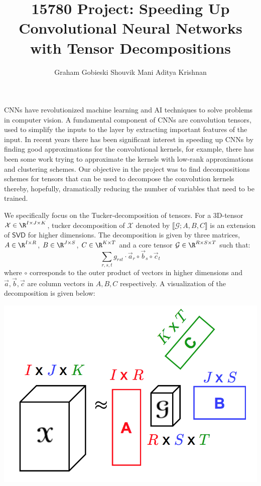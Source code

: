 \documentclass[a4paper]{article}
\title{\vspace{-2em} 15780 Project: Speeding Up Convolutional Neural Networks with Tensor Decompositions}
\author{Graham Gobieski \quad  Shouvik Mani \quad  Aditya Krishnan}
\date{ \vspace{-2em}}
\begin{document}
\maketitle

CNNs have revolutionized machine learning and AI techniques to solve problems in computer vision. A fundamental component of CNNs are convolution tensors, used to simplify the inputs to the layer by extracting important features of the input. In recent years there has been significant interest in speeding up CNNs by finding good approximations for the convolutional kernels, for example, there has been some work trying to approximate the kernels with low-rank approximations and clustering schemes. Our objective in the project was to find decompositions schemes for tensors that can be used to decompose the convolution kernels thereby, hopefully, dramatically reducing the number of variables that need to be trained. 

We specifically focus on the Tucker-decomposition of tensors. For a 3D-tensor $\mathcal{X} \in \R^{I \times J \times K}$, tucker decomposition of $\mathcal{X}$ denoted by $\llbracket \mathcal{G}; A, B, C \rrbracket$ is an extension of $\mathsf{SVD}$ for higher dimensions. The decomposition is given by three matrices, $A \in \R^{I \times R}$, $B \in \R^{J \times S}$, $C \in \R^{K \times T}$ and a core tensor $\mathcal{G} \in \R^{R \times S \times T}$ such that: 
$$ \sum_{r, s , t} g_{rst} \cdot \vec{a}_r \circ \vec{b}_s \circ \vec{c}_t  $$
where $\circ$ corresponds to the outer product of vectors in higher dimensions and $\vec{a}, \vec{b}, \vec{c}$ are column vectors in $A, B, C$ respectively. A visualization of the decomposition is given below: 
\begin{center}
\includegraphics[scale=0.3]{tucker}
\end{center}
\end{document}

